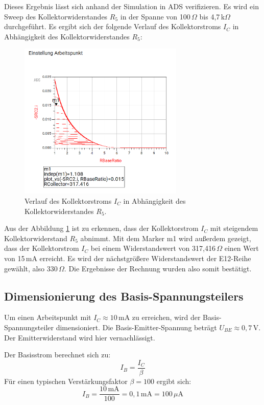 Dieses Ergebnis lässt sich anhand der Simulation in \ac{ADS} verifizieren. Es wird ein Sweep des Kollektorwiderstandes $R_5$ in der Spanne von 100\,\(\Omega\) bis 4,7\,k\(\Omega\) durchgeführt.
Es ergibt sich der folgende Verlauf des Kollektorstroms $I_C$ in Abhängigkeit des Kollektorwiderstandes $R_5$:
\begin{figure}[H] %
    \centering
    \includegraphics[width=0.7\textwidth]{Pictures/RCollector.png}
    \caption{Verlauf des Kollektorstroms $I_C$ in Abhängigkeit des Kollektorwiderstandes $R_5$.}
    \label{fig:RCollector}
\end{figure}

Aus der Abbildung \ref{fig:RCollector} ist zu erkennen, dass der Kollektorstrom $I_C$ mit steigendem Kollektorwiderstand $R_5$ abnimmt. Mit dem Marker m1 wird außerdem
gezeigt, dass der Kollektorstrom $I_C$ bei einem Widerstandswert von 317,416\,\(\Omega\) einen Wert von 15\,mA erreicht. Es wird der nächstgrößere Widerstandswert der E12-Reihe gewählt, also 330\,\(\Omega\).
Die Ergebnisse der Rechnung wurden also somit bestätigt.

\subsection{Dimensionierung des Basis-Spannungsteilers}

Um einen Arbeitspunkt mit $I_C \approx 10\,\mathrm{mA}$ zu erreichen, wird der Basis-Spannungsteiler dimensioniert. Die Basis-Emitter-Spannung beträgt $U_{BE} \approx 0{,}7\,\mathrm{V}$. Der Emitterwiderstand wird hier vernachlässigt.

Der Basisstrom berechnet sich zu:
\begin{equation}
    I_B = \frac{I_C}{\beta}
\end{equation}
Für einen typischen Verstärkungsfaktor $\beta = 100$ ergibt sich:
\begin{equation}
    I_B = \frac{10\,\mathrm{mA}}{100} = 0{,}1\,\mathrm{mA} = 100\,\mu\mathrm{A}
\end{equation}

